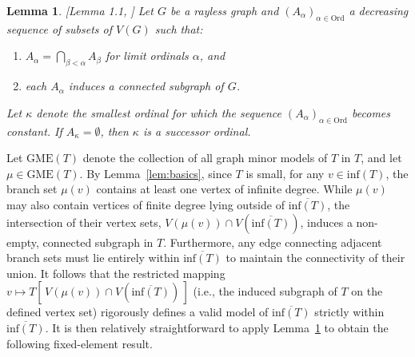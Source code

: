 \documentclass[12pt]{amsart}
\newtheorem{lemma}{Lemma}[section]
\numberwithin{mytheorem}{section} %
\numberwithin{mylemma}{section} %
\numberwithin{mycorollary}{section} %
\begin{document}
\begin{lemma}\label{lem:Polat}[Lemma 1.1, \cite{P}] Let $G$ be a rayless graph and $(A_\alpha)_{\alpha\in \text{Ord}}$ a decreasing sequence of subsets of $V(G)$ such that:
\begin{enumerate}
\item $A_\alpha = \bigcap_{\beta < \alpha} A_\beta$ for limit ordinals $\alpha$, and
\item each $A_\alpha$ induces a connected subgraph of $G$.
\end{enumerate}
Let $\kappa$ denote the smallest ordinal for which the sequence $(A_\alpha)_{\alpha\in \text{Ord}}$ becomes constant. If $A_\kappa =\emptyset$, then $\kappa$ is a successor ordinal.
\end{lemma}

Let $\text{GME}(T)$ denote the collection of all graph minor models of $T$ in $T$, and let $\mu \in \text{GME}(T)$. By Lemma~\ref{lem:basics}, since $T$ is small, for any $v\in \text{inf}(T)$, the branch set $\mu(v)$ contains at least one vertex of infinite degree. While $\mu(v)$ may also contain vertices of finite degree lying outside of $\overline{\text{inf}(T)}$, the intersection of their vertex sets, $V(\mu(v)) \cap V(\overline{\text{inf}(T)})$, induces a non-empty, connected subgraph in $T$. Furthermore, any edge connecting adjacent branch sets must lie entirely within $\overline{\text{inf}(T)}$ to maintain the connectivity of their union. It follows that the restricted mapping $v \mapsto T[\,V(\mu(v)) \cap V(\overline{\text{inf}(T)})\,]$ (i.e., the induced subgraph of $T$ on the defined vertex set)  rigorously defines a valid model of $\overline{\text{inf}(T)}$ strictly within $\overline{\text{inf}(T)}$. It is then relatively straightforward to apply Lemma~\ref{lem:Polat} to obtain the following fixed-element result.
\end{document}
